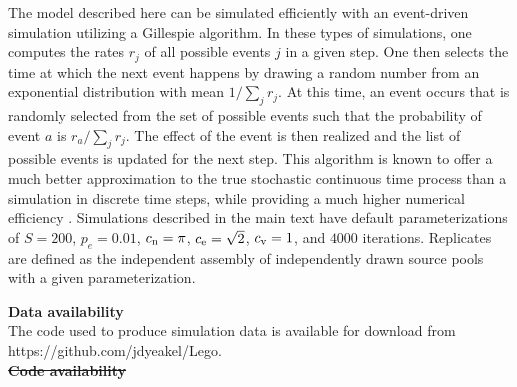 \documentclass[twocolumn,preprintnumbers,amsmath,amssymb,superscriptaddress,linenumbers]{revtex4-1}
\providecommand{\DIFadd}[1]{{\protect\color{blue}\uwave{#1}}} %
\providecommand{\DIFdel}[1]{{\protect\color{red}\sout{#1}}}                      %
\providecommand{\DIFaddbegin}{} %
\providecommand{\DIFaddend}{} %
\providecommand{\DIFdelbegin}{} %
\providecommand{\DIFdelend}{} %
\newcommand{\DIFscaledelfig}{0.5}
\newlength{\DIFdelgraphicswidth} %
\newlength{\DIFdelgraphicsheight} %
\newcommand{\DIFaddincludegraphics}[2][]{{\color{blue}\fbox{\DIFOincludegraphics[#1]{#2}}}} %
\newcommand{\DIFdelincludegraphics}[2][]{%
\sbox{\DIFdelgraphicsbox}{\DIFOincludegraphics[#1]{#2}}%
\settoboxwidth{\DIFdelgraphicswidth}{\DIFdelgraphicsbox} %
\settoboxtotalheight{\DIFdelgraphicsheight}{\DIFdelgraphicsbox} %
\scalebox{\DIFscaledelfig}{%
\parbox[b]{\DIFdelgraphicswidth}{\usebox{\DIFdelgraphicsbox}\\[-\baselineskip] \rule{\DIFdelgraphicswidth}{0em}}\llap{\resizebox{\DIFdelgraphicswidth}{\DIFdelgraphicsheight}{%
\setlength{\unitlength}{\DIFdelgraphicswidth}%
\begin{picture}(1,1)%
\thicklines\linethickness{2pt} %
{\color[rgb]{1,0,0}\put(0,0){\framebox(1,1){}}}%
{\color[rgb]{1,0,0}\put(0,0){\line( 1,1){1}}}%
{\color[rgb]{1,0,0}\put(0,1){\line(1,-1){1}}}%
\end{picture}%
}\hspace*{3pt}}} %
} %
\DeclareRobustCommand{\DIFaddbegin}{\DIFOaddbegin \let\includegraphics\DIFaddincludegraphics} %
\DeclareRobustCommand{\DIFaddend}{\DIFOaddend \let\includegraphics\DIFOincludegraphics} %
\DeclareRobustCommand{\DIFdelbegin}{\DIFOdelbegin \let\includegraphics\DIFdelincludegraphics} %
\DeclareRobustCommand{\DIFdelend}{\DIFOaddend \let\includegraphics\DIFOincludegraphics} %
\begin{document}
{  The model described here can be simulated efficiently with an event-driven simulation utilizing a Gillespie algorithm.
  In these types of simulations, one computes the rates $r_j$ of all possible events $j$ in a given step.
  One then selects the time at which the next event happens by drawing a random number from an exponential distribution with mean $1/\sum_j{r_j}$.
  At this time, an event occurs that is randomly selected from the set of possible events such that the probability of event $a$ is $r_a/\sum_j{r_j}$.
  The effect of the event is then realized and the list of possible events is updated for the next step.
  This algorithm is known to offer a much better approximation to the true stochastic continuous time process than a simulation in discrete time steps, while providing a much higher numerical efficiency \cite{Gillespie1977}.
  Simulations described in the main text have default parameterizations of $S=200$, $p_e=0.01$, $c_{\rm n} = \pi$, $c_{\rm e} = \sqrt{2}$, $c_{\rm v} = 1$, and $4000$ iterations.
  Replicates are defined as the independent assembly of independently drawn source pools with a given parameterization.}
\DIFaddend 

\vspace{2mm}
\noindent \textbf{Data \DIFaddbegin \DIFadd{and Code }\DIFaddend availability}\\
  \DIFdelbegin %
\DIFdelend \DIFaddbegin \footnotesize{
  The code used to produce simulation data is available for download from https://github.com/jdyeakel/Lego.
  }\DIFaddend \\
\DIFaddbegin 

\clearpage
\onecolumngrid
\DIFaddend \noindent \textbf{\DIFdelbegin \DIFdel{Code availability}\DIFdelend \DIFaddbegin \DIFadd{Figure legends}\DIFaddend }\\
  \DIFdelbegin %
\DIFdelend 
\end{document}
